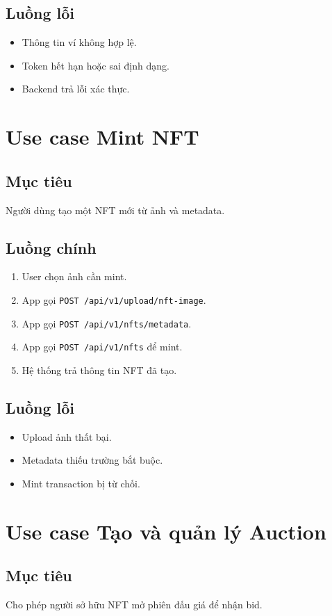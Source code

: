 \documentclass[a4paper,12pt]{report}
\begin{document}
\subsection{Luồng lỗi}
\begin{itemize}
    \item Thông tin ví không hợp lệ.
    \item Token hết hạn hoặc sai định dạng.
    \item Backend trả lỗi xác thực.
\end{itemize}

\section{Use case Mint NFT}
\subsection{Mục tiêu}
Người dùng tạo một NFT mới từ ảnh và metadata.

\subsection{Luồng chính}
\begin{enumerate}
    \item User chọn ảnh cần mint.
    \item App gọi \texttt{POST /api/v1/upload/nft-image}.
    \item App gọi \texttt{POST /api/v1/nfts/metadata}.
    \item App gọi \texttt{POST /api/v1/nfts} để mint.
    \item Hệ thống trả thông tin NFT đã tạo.
\end{enumerate}

\subsection{Luồng lỗi}
\begin{itemize}
    \item Upload ảnh thất bại.
    \item Metadata thiếu trường bắt buộc.
    \item Mint transaction bị từ chối.
\end{itemize}

\section{Use case Tạo và quản lý Auction}
\subsection{Mục tiêu}
Cho phép người sở hữu NFT mở phiên đấu giá để nhận bid.
\end{document}
